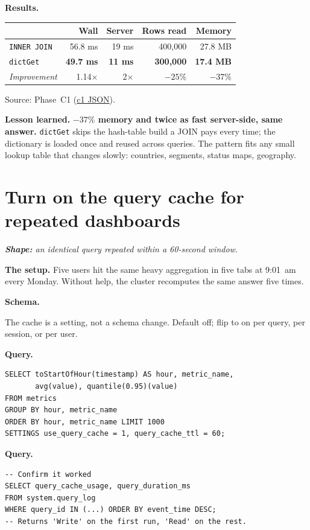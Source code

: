 \documentclass[11pt]{article}
\renewcommand{\arraystretch}{1.15}
\newcommand{\shape}[1]{%
  \par\noindent\textit{\textbf{Shape:} #1}\par\smallskip}
\newcommand{\schemaHd}{%
  \par\smallskip\noindent\textbf{\color{accentblue}Schema.}\par\nopagebreak\smallskip}
\newcommand{\queryHd}{%
  \par\smallskip\noindent\textbf{\color{accentblue}Query.}\par\nopagebreak\smallskip}
\newcommand{\resultsHd}{%
  \par\smallskip\noindent\textbf{\color{accentblue}Results.}\par\nopagebreak\smallskip}
\newcommand{\lesson}[1]{%
  \par\medskip
  \begin{lessonbox}\textbf{\color{accentgreen}Lesson learned.}\enspace #1\end{lessonbox}}
\begin{document}
\resultsHd
\renewcommand{\arraystretch}{1.20}
\begin{tabularx}{\linewidth}{@{}X r r r r@{}}
\toprule
                            & \textbf{Wall} & \textbf{Server} & \textbf{Rows read} & \textbf{Memory}\\
\midrule
\texttt{INNER JOIN}         & 56.8 ms & 19 ms & 400{,}000 & 27.8 MB\\
\rowcolor{accentgreen!12}\texttt{dictGet}
                            & \textbf{49.7 ms} & \textbf{11 ms} & \textbf{300{,}000} & \textbf{17.4 MB}\\
\textit{Improvement}        & 1.14$\times$ & 2$\times$ & $-25\%$ & $-37\%$\\
\bottomrule
\end{tabularx}

\smallskip
Source: Phase~C1
(\href{run:results/experiment_c1_dictionary_vs_join_20260503_192050.json}{c1 JSON}).

\lesson{%
\textbf{$-37\%$ memory and twice as fast server-side, same answer.}
\texttt{dictGet} skips the hash-table build a JOIN pays every time;
the dictionary is loaded once and reused across queries. The pattern
fits any small lookup table that changes slowly: countries, segments,
status maps, geography.}

\section{Turn on the query cache for repeated dashboards}

\shape{an identical query repeated within a 60-second window.}

\textbf{The setup.}
Five users hit the same heavy aggregation in five tabs at 9:01~am
every Monday. Without help, the cluster recomputes the same answer
five times.

\schemaHd
The cache is a setting, not a schema change. Default off; flip to on
per query, per session, or per user.

\queryHd
\begin{lstlisting}
SELECT toStartOfHour(timestamp) AS hour, metric_name,
       avg(value), quantile(0.95)(value)
FROM metrics
GROUP BY hour, metric_name
ORDER BY hour, metric_name LIMIT 1000
SETTINGS use_query_cache = 1, query_cache_ttl = 60;
\end{lstlisting}

\queryHd
\begin{lstlisting}
-- Confirm it worked
SELECT query_cache_usage, query_duration_ms
FROM system.query_log
WHERE query_id IN (...) ORDER BY event_time DESC;
-- Returns 'Write' on the first run, 'Read' on the rest.
\end{lstlisting}
\end{document}
